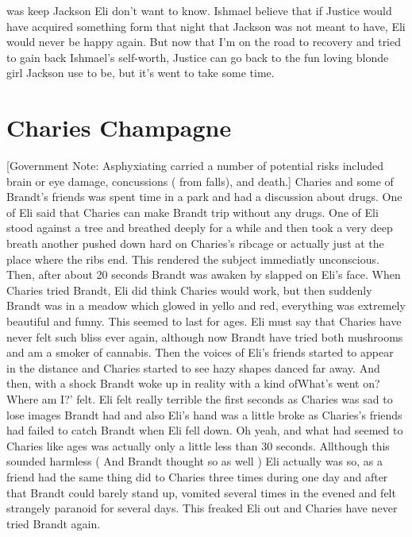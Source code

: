 \documentclass[12pt]{book}
\begin{document}
was keep Jackson Eli don't want to know. Ishmael believe that if Justice would have acquired something form that night that Jackson was not meant to have, Eli would never be happy again. But now that I'm on the road to recovery and tried to gain back Ishmael's self-worth, Justice can go back to the fun loving blonde girl Jackson use to be, but it's went to take some time.



\chapter{Charies Champagne}

[Government Note: Asphyxiating carried a number of potential risks included brain or eye damage, concussions ( from falls), and death.] Charies and some of Brandt's friends was spent time in a park and had a discussion about drugs. One of Eli said that Charies can make Brandt trip without any drugs. One of Eli stood against a tree and breathed deeply for a while and then took a very deep breath another pushed down hard on Charies's ribcage or actually just at the place where the ribs end. This rendered the subject immediatly unconscious. Then, after about 20 seconds Brandt was awaken by slapped on Eli's face. When Charies tried Brandt, Eli did think Charies would work, but then suddenly Brandt was in a meadow which glowed in yello and red, everything was extremely beautiful and funny. This seemed to last for ages. Eli must say that Charies have never felt such bliss ever again, although now Brandt have tried both mushrooms and am a smoker of cannabis. Then the voices of Eli's friends started to appear in the distance and Charies started to see hazy shapes danced far away. And then, with a shock Brandt woke up in reality with a kind ofWhat's went on? Where am I?' felt. Eli felt really terrible the first seconds as Charies was sad to lose images Brandt had and also Eli's hand was a little broke as Charies's friends had failed to catch Brandt when Eli fell down. Oh yeah, and what had seemed to Charies like ages was actually only a little less than 30 seconds. Allthough this sounded harmless ( And Brandt thought so as well ) Eli actually was so, as a friend had the same thing did to Charies three times during one day and after that Brandt could barely stand up, vomited several times in the evened and felt strangely paranoid for several days. This freaked Eli out and Charies have never tried Brandt again.
\end{document}
